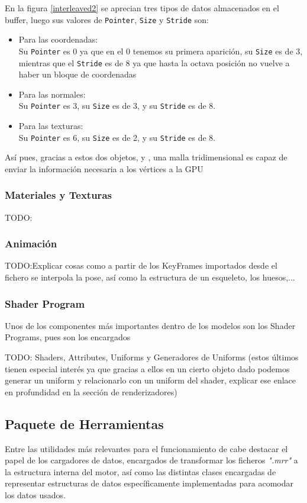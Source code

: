 En la figura \ref{interleaved2} se aprecian tres tipos de datos almacenados en el buffer, luego sus valores de \texttt{Pointer}, \texttt{Size} y \texttt{Stride} son:
\begin{itemize}
\item Para las coordenadas:\\
Su \texttt{Pointer} es 0 ya que en el 0 tenemos su primera aparición, su \texttt{Size} es de 3, mientras que el \texttt{Stride} es de 8 ya que hasta la octava posición no vuelve a haber un bloque de coordenadas

\item Para las normales:\\
Su \texttt{Pointer} es 3, su \texttt{Size} es de 3, y su \texttt{Stride} es de 8.

\item Para las texturas:\\
Su \texttt{Pointer} es 6, su \texttt{Size} es de 2, y su \texttt{Stride} es de 8.
\end{itemize}

Así pues, gracias a estos dos objetos, \rorefbuffer y \rorefbufferkey, una malla tridimensional es capaz de enviar la información necesaria a los vértices a la GPU
 
\subsubsection{Materiales y Texturas}
TODO:
\subsubsection{Animación}
TODO:Explicar cosas como a partir de los KeyFrames importados desde el fichero se interpola la pose, así como la estructura de un esqueleto, los huesos,...

\subsubsection{Shader Program}
Unos de los componentes más importantes dentro de los modelos son los Shader Programs, pues son los encargados


TODO: Shaders, Attributes, Uniforms y Generadores de Uniforms (estos últimos tienen especial interés ya que gracias a ellos en un cierto objeto dado podemos generar un uniform y relacionarlo con un uniform del shader, explicar ese enlace en profundidad en la sección de renderizadores)

\subsection{Paquete de Herramientas}
Entre las utilidades más relevantes para el funcionamiento de \robotto cabe destacar el papel de los cargadores de datos, encargados de transformar los ficheros \textit{".mrr"} a la estructura interna del motor, así como las distintas clases encargadas de representar estructuras de datos específicamente implementadas para acomodar los datos usados.

